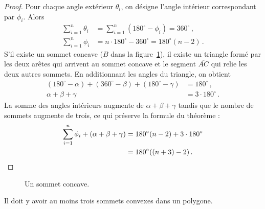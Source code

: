 \begin{proof}
Pour chaque angle extérieur $\theta_i$, on désigne l'angle intérieur correspondant par $\phi_i$. Alors 
\begin{align*}
\displaystyle\sum_{i=1}^n \theta_i &=\displaystyle\sum_{i=1}^n (180^\circ-\phi_i)= 360^\circ\,,\\
\displaystyle\sum_{i=1}^n \phi_i &= n\cdot 180^\circ-360^\circ =180^\circ(n-2)\,.
\end{align*}
S'il existe un sommet concave ($B$ dans la figure~\ref{f.museum.concave}), il existe un triangle formé par les deux arêtes qui arrivent au sommet concave et le segment  $\overline{AC}$ qui relie les deux autres sommets. En additionnant les angles du triangle, on obtient 
\begin{align*}
(180^\circ - \alpha) + (360^\circ - \beta) + (180^\circ - \gamma) &= 180^\circ\,,\\
\alpha + \beta + \gamma &= 3\cdot 180^\circ\,.
\end{align*}
La somme des angles intérieurs augmente de $\alpha+\beta+\gamma$ tandis que le nombre de sommets augmente de trois, ce qui  préserve  la formule du théorème :
\begin{align*}
\displaystyle\sum_{i=1}^n \phi_i + (\alpha + \beta + \gamma) &= 180^\circ(n-2)+3\cdot 180^\circ\\
&= 180^\circ((n+3)-2)\,.\qedhere
\end{align*}
\end{proof}

\begin{figure}[htbp]
\centering
{}
\caption{Un sommet concave.}
\label{f.museum.concave}
\end{figure}


\begin{theorem}\label{thm.convex}
Il doit y avoir au moins trois sommets convexes dans un polygone.
\end{theorem}

